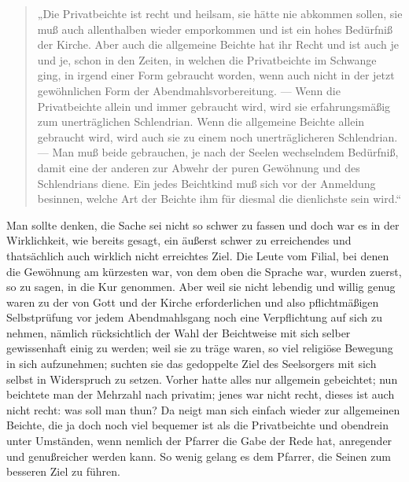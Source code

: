 \begin{quote}
„Die Privatbeichte ist recht und heilsam, sie hätte nie abkommen sollen, sie muß auch allenthalben wieder emporkommen und ist ein hohes Bedürfniß der Kirche. Aber auch die allgemeine Beichte hat ihr Recht und ist auch je und je, schon in den Zeiten, in welchen die Privatbeichte im Schwange ging, in irgend einer Form gebraucht worden, wenn auch nicht in der jetzt gewöhnlichen Form der Abendmahlsvorbereitung. — Wenn die Privatbeichte allein und immer gebraucht wird, wird sie erfahrungsmäßig zum unerträglichen Schlendrian. Wenn die allgemeine Beichte allein gebraucht wird, wird auch sie zu einem noch unerträglicheren Schlendrian. — Man muß beide gebrauchen, je nach der Seelen wechselndem Bedürfniß, damit eine der anderen zur Abwehr der puren Gewöhnung und des Schlendrians diene. Ein jedes Beichtkind muß sich vor der
Anmeldung besinnen, welche Art der Beichte ihm für diesmal die dienlichste sein wird.“
\end{quote}

Man sollte denken, die Sache sei nicht so schwer zu fassen und doch war es in der Wirklichkeit, wie bereits gesagt, ein äußerst schwer zu erreichendes und thatsächlich auch wirklich nicht erreichtes Ziel. Die Leute vom Filial, bei denen die Gewöhnung am kürzesten war, von dem oben die Sprache war, wurden zuerst, so zu sagen, in die Kur genommen. Aber weil sie nicht lebendig und willig genug waren zu der von Gott und der Kirche erforderlichen und also pflichtmäßigen Selbstprüfung vor jedem Abendmahlsgang noch eine Verpflichtung auf sich zu nehmen, nämlich rücksichtlich der Wahl der Beichtweise mit sich selber gewissenhaft einig zu werden; weil sie zu träge waren, so viel religiöse Bewegung in sich aufzunehmen; suchten sie das gedoppelte Ziel des Seelsorgers mit sich selbst in Widerspruch zu setzen. Vorher hatte alles nur allgemein gebeichtet; nun beichtete man der Mehrzahl nach privatim; jenes war nicht recht, dieses ist auch nicht recht: was soll man thun? Da neigt man sich einfach wieder zur allgemeinen Beichte, die ja doch noch viel bequemer ist als die Privatbeichte und obendrein unter Umständen, wenn nemlich der Pfarrer die Gabe der Rede hat, anregender und genußreicher werden kann. So wenig gelang es dem Pfarrer, die Seinen zum besseren Ziel zu führen.


